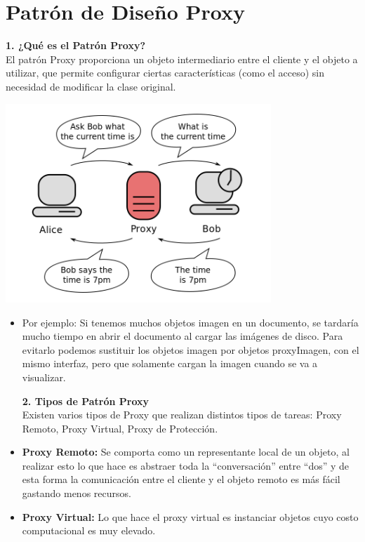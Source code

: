 \section{Patrón de Diseño Proxy} 
\textbf {1.    ¿Qué es el Patrón Proxy?}
\textbf{}\\
El patrón Proxy proporciona un objeto intermediario entre el cliente y el objeto a utilizar, que permite configurar ciertas características (como el acceso) sin necesidad de modificar la clase original.
\begin{flushleft}
\begin{center}
	\includegraphics[width=10cm]{./Imagenes/proxy1} 
	\end{center}
\begin{itemize}
	\item Por ejemplo:
Si tenemos muchos objetos imagen en un documento, se tardaría mucho tiempo en abrir el documento al cargar las imágenes de disco. Para evitarlo podemos sustituir los objetos imagen por objetos proxyImagen, con el mismo interfaz, pero que solamente cargan la imagen cuando se va a visualizar.

\textbf {2.	Tipos de Patrón Proxy}
\textbf{}\\
Existen varios tipos de Proxy que realizan distintos tipos de tareas: Proxy Remoto, Proxy Virtual, Proxy de Protección.

\item	\textbf {Proxy Remoto:} Se comporta como un representante local de un objeto, al realizar esto lo que hace es abstraer toda la “conversación” entre “dos” y de esta forma la comunicación entre el cliente y el objeto remoto es más fácil gastando menos recursos.
\item	\textbf {Proxy Virtual:} Lo que hace el proxy virtual es instanciar objetos cuyo costo computacional es muy elevado.


\end{itemize}
\end{flushleft}
